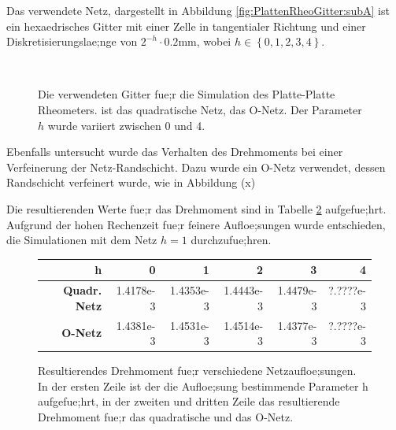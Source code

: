 Das verwendete Netz, dargestellt in Abbildung \ref{fig:PlattenRheoGitter:subA} ist ein hexaedrisches Gitter mit einer Zelle in tangentialer Richtung und einer Diskretisierungslae;nge von $2^{-h} \cdot 0.2\mbox{mm}$, wobei $h\in\left\{ 0,1,2,3,4 \right\}$.
%
\begin{figure}
    \centering
    \\
    \caption{Die verwendeten Gitter fue;r die Simulation des Platte-Platte Rheometers.  ist das quadratische Netz,  das O-Netz.
    Der Parameter $h$ wurde variiert zwischen 0 und 4.}
    \label{fig:PlattenRheoGitter}
\end{figure}
%

Ebenfalls untersucht wurde das Verhalten des Drehmoments bei einer Verfeinerung der Netz-Randschicht. Dazu wurde ein O-Netz verwendet, dessen Randschicht verfeinert wurde, wie in Abbildung (x)

Die resultierenden Werte fue;r das Drehmoment sind in Tabelle \ref{fig:ResultingTorque} aufgefue;hrt. Aufgrund der hohen Rechenzeit fue;r feinere Aufloe;sungen wurde entschieden, die Simulationen mit dem Netz $h=1$ durchzufue;hren.
%
\begin{figure}
    \centering
    \begin{tabular}{r r r r r r}
        \textbf{h} \vline & 0 & 1 & 2 & 3 & 4\\
        \hline
        \textbf{Quadr. Netz} \vline & 1.4178e-3 & 1.4353e-3 & 1.4443e-3 & 1.4479e-3 & ?.????e-3\\
        \textbf{O-Netz} \vline & 1.4381e-3 & 1.4531e-3 & 1.4514e-3 & 1.4377e-3 & ?.????e-3
    \end{tabular}
    \caption{Resultierendes Drehmoment fue;r verschiedene Netzaufloe;sungen.\\
    In der ersten Zeile ist der die Aufloe;sung bestimmende Parameter h aufgefue;hrt, in der zweiten und dritten Zeile das resultierende Drehmoment fue;r das quadratische und das O-Netz.}
    \label{fig:ResultingTorque}
\end{figure}
%
